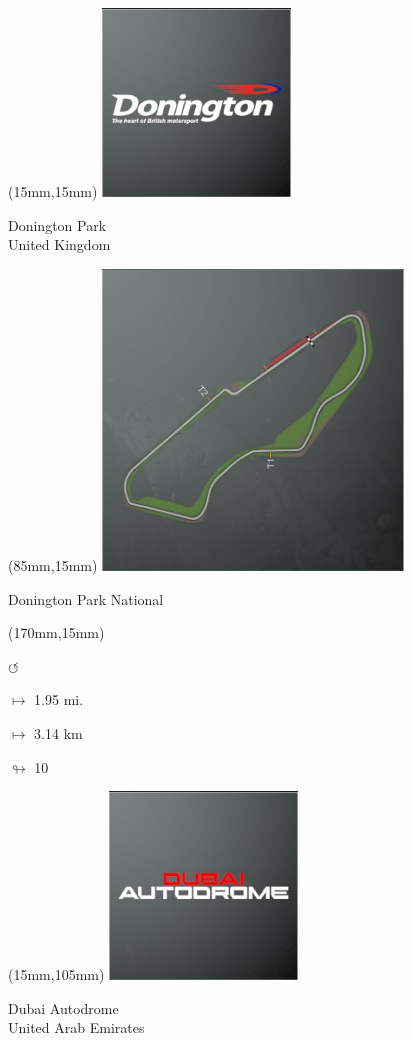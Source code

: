 \begin{textblock*}{60mm}(15mm,15mm)%
\includegraphics[width=50mm]{LG/2015-05-20_00080.png}
\par Donington Park\\ United Kingdom
\end{textblock*}
\begin{textblock*}{80mm}(85mm,15mm)%
\includegraphics[width=80mm]{TR/2015-05-20_00023.png}
\centerline{Donington Park National}
\end{textblock*}
\begin{textblock*}{30mm}(170mm,15mm)%
\par \Huge$\circlearrowleft$
\Large
\par$\mapsto$ 1.95 mi.
\par$\mapsto$ 3.14 km
\par$\looparrowright$ 10
\end{textblock*}
\begin{textblock*}{60mm}(15mm,105mm)%
\includegraphics[width=50mm]{LG/2015-05-20_00081.png}
\par Dubai Autodrome\\ United Arab Emirates
\end{textblock*}
